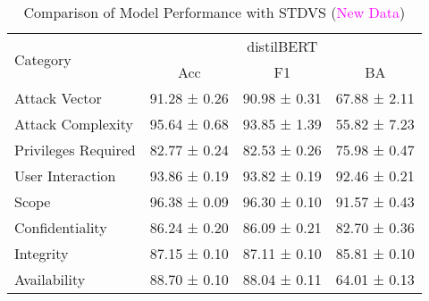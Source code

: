 \documentclass{article}
\begin{document}
\begin{table}[h!]
	\centering
	\small
	\begin{tabular}{|l|ccc|}
		\hline
		\multirow{2}{*}{Category} & \multicolumn{3}{c|}{distilBERT }                               \\
		\cline{2-4}
		                          & Acc                              & F1           & BA           \\
		\hline
		Attack Vector             & 91.28 ± 0.26                     & 90.98 ± 0.31 & 67.88 ± 2.11 \\
		Attack Complexity         & 95.64 ± 0.68                     & 93.85 ± 1.39 & 55.82 ± 7.23 \\
		Privileges Required       & 82.77 ± 0.24                     & 82.53 ± 0.26 & 75.98 ± 0.47 \\
		User Interaction          & 93.86 ± 0.19                     & 93.82 ± 0.19 & 92.46 ± 0.21 \\
		Scope                     & 96.38 ± 0.09                     & 96.30 ± 0.10 & 91.57 ± 0.43 \\
		Confidentiality           & 86.24 ± 0.20                     & 86.09 ± 0.21 & 82.70 ± 0.36 \\
		Integrity                 & 87.15 ± 0.10                     & 87.11 ± 0.10 & 85.81 ± 0.10 \\
		Availability              & 88.70 ± 0.10                     & 88.04 ± 0.11 & 64.01 ± 0.13 \\
		\hline
	\end{tabular}
	\caption{Comparison of Model Performance with STDVS
		(\textcolor{magenta}{New Data})}
	\label{tab:model_performance}
\end{table}
\end{document}
